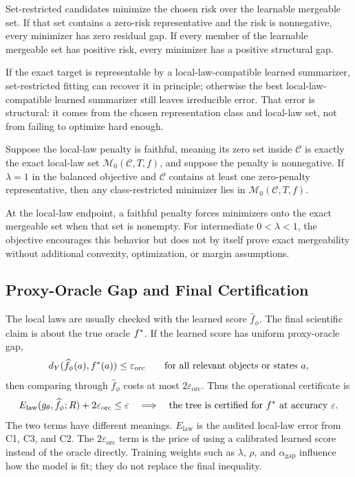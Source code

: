 \begin{proposition}
\label{prop:v7-projection-interpretation}
Set-restricted candidates minimize the chosen risk over the learnable
mergeable set. If that set contains a zero-risk representative and the
risk is nonnegative, every minimizer has zero residual gap. If every
member of the learnable mergeable set has positive risk, every
minimizer has a positive structural gap.
\end{proposition}

If the exact target is representable by a local-law-compatible
learned summarizer, set-restricted fitting can recover it in principle;
otherwise the best local-law-compatible learned summarizer still leaves
irreducible error. That error is structural: it comes from the chosen
representation class and local-law set, not from failing to optimize
hard enough.

\begin{proposition}
\label{prop:v7-local-law-endpoint}
Suppose the local-law penalty is faithful, meaning its zero set inside
\(\mathcal C\) is exactly the exact local-law set
\(\mathcal M_0(\mathcal C,T,f)\), and suppose the penalty is
nonnegative. If \(\lambda=1\) in the balanced objective and
\(\mathcal C\) contains at least one zero-penalty representative, then
any class-restricted minimizer lies in
\(\mathcal M_0(\mathcal C,T,f)\).
\end{proposition}

At the local-law endpoint, a faithful penalty forces minimizers onto
the exact mergeable set when that set is nonempty. For intermediate
\(0<\lambda<1\), the objective encourages this behavior but does not by
itself prove exact mergeability without additional convexity,
optimization, or margin assumptions.

\subsection{Proxy-Oracle Gap and Final Certification}
\label{app:v7-gap-certification}

The local laws are usually checked with the learned score
\(\widehat f_\phi\). The final scientific claim is about the true
oracle \(f^\ast\). If the learned score has uniform proxy-oracle gap,
\[
  d_Y(\widehat f_\phi(a),f^\ast(a))\le\varepsilon_{\mathrm{orc}}
  \qquad\text{for all relevant objects or states }a,
\]
then comparing through \(\widehat f_\phi\) costs at most
\(2\varepsilon_{\mathrm{orc}}\). Thus the operational certificate is
\[
  E_{\mathrm{law}}(g_\theta,\widehat f_\phi;R)+2\varepsilon_{\mathrm{orc}}
  \le
  \varepsilon
  \quad\Longrightarrow\quad
  \text{the tree is certified for }f^\ast\text{ at accuracy }\varepsilon.
\]
The two terms have different meanings. \(E_{\mathrm{law}}\) is the
audited local-law error from C1, C3, and C2. The \(2\varepsilon_{\mathrm{orc}}\)
term is the price of using a calibrated learned score instead of the
oracle directly. Training weights such as \(\lambda\), \(\rho\), and
\(\alpha_{\mathrm{gap}}\) influence how the model is fit; they do not
replace the final inequality.


